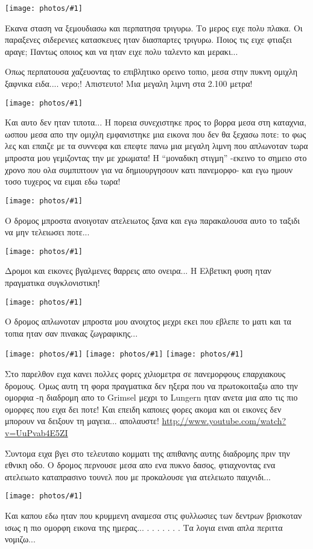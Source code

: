 \documentclass[]{book}
\newcommand\photo[1]{\noindent\texttt{[image: photos/\#1]}}
\begin{document}
\photo{65.jpg}

Εκανα σταση να ξεμουδιασω και περπατησα τριγυρω. Το μερος ειχε πολυ πλακα. Οι παραξενες σιδερενιες κατασκευες ηταν διασπαρτες τριγυρω. Ποιος τις ειχε φτιαξει αραγε; Παντως οποιος και να ηταν ειχε πολυ ταλεντο και μερακι...

Οπως περπατουσα χαζευοντας το επιβλητικο ορεινο τοπιο, μεσα στην πυκνη ομιχλη ξαφνικα ειδα.... νερο;! Απιστευτο! Μια μεγαλη λιμνη στα 2.100 μετρα! 

\photo{66.jpg}

Και αυτο δεν ηταν τιποτα...
Η πορεια συνεχιστηκε προς το βορρα μεσα στη καταχνια, ωσπου μεσα απο την ομιχλη εμφανιστηκε μια εικονα που δεν θα ξεχασω ποτε: το φως λες και επαιζε με τα συννεφα και επεφτε πανω μια μεγαλη λιμνη που απλωνοταν τωρα μπροστα μου γεμιζοντας την με χρωματα! 
Η ``μοναδικη στιγμη'' -εκεινο το σημειο στο χρονο που ολα συμπιπτουν για να δημιουργησουν κατι πανεμορφο- και εγω ημουν τοσο τυχερος να ειμαι εδω τωρα!

\photo{67.jpg}

Ο δρομος μπροστα ανοιγοταν ατελειωτος ξανα και εγω παρακαλουσα αυτο το ταξιδι να μην τελειωσει ποτε...

\photo{68.jpg}

Δρομοι και εικονες βγαλμενες θαρρεις απο ονειρα... Η Ελβετικη φυση ηταν πραγματικα συγκλονιστικη!

\photo{69.jpg}

Ο δρομος απλωνοταν μπροστα μου ανοιχτος μεχρι εκει που εβλεπε το ματι και τα τοπια ηταν σαν πινακας ζωγραφικης...

\photo{70.jpg}
\photo{71.jpg}
\photo{72.jpg}

Στο παρελθον ειχα κανει πολλες φορες χιλιομετρα σε πανεμορφους επαρχιακους δρομους. Ομως αυτη τη φορα πραγματικα δεν ηξερα που να πρωτοκοιταξω απο την ομορφια -η διαδρομη απο το Grimsel μεχρι το Lungern ηταν ανετα μια απο τις πιο ομορφες που ειχα δει ποτε! Και επειδη καποιες φορες ακομα και οι εικονες δεν μπορουν να δειξουν τη μαγεια... απολαυστε! \url{http://www.youtube.com/watch?v=UuPvab4E5ZI}

Συντομα ειχα βγει στο τελευταιο κομματι της απιθανης αυτης διαδρομης πριν την εθνικη οδο.
Ο δρομος περνουσε μεσα απο ενα πυκνο δασος, φτιαχνοντας ενα ατελειωτο καταπρασινο τουνελ που με προκαλουσε για ατελειωτο παιχνιδι... 

\photo{73.jpg}

Και καπου εδω ηταν που κρυμμενη αναμεσα στις φυλλωσιες των δεντρων βρισκοταν ισως η πιο ομορφη εικονα της ημερας...
.
.
.
.
.
.
.
Τα λογια ειναι απλα περιττα νομιζω...
\end{document}
